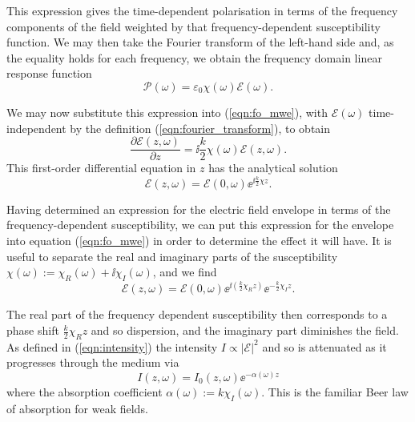     This expression gives the time-dependent polarisation in terms of the
    frequency components of the field weighted by that frequency-dependent
    susceptibility function. We may then take the Fourier transform of the 
    left-hand side and, as the equality holds for each frequency, we obtain the
    frequency domain linear response function
    \begin{equation}\label{eqn:lin_pol_freq} 
      \mathcal{P}(\omega) = \varepsilon_0 \chi(\omega) \mathcal{E}(\omega).
    \end{equation}

    We may now substitute this expression into (\ref{eqn:fo_mwe}), with
    $\mathcal{E}(\omega)$ time-independent by the definition
    (\ref{eqn:fourier_transform}), to obtain
    \begin{equation}\label{eqn:fo_mwe_linear}
      \frac{\partial \mathcal{E}(z, \omega)}{\partial z} = 
      \ii \frac{k}{2} \chi(\omega) \mathcal{E}(z, \omega).
    \end{equation}
    This first-order differential equation in $z$ has the analytical solution 
    \begin{equation}
      \mathcal{E}(z, \omega) = \mathcal{E}(0, \omega) \ee^{\ii \tfrac{k}{2} \chi z}.
    \end{equation}

    Having determined an expression for the electric field envelope in terms of
    the frequency-dependent susceptibility, we can put this expression for the
    envelope into equation (\ref{eqn:fo_mwe}) in order to determine the effect
    it will have. It is useful to separate the real and imaginary parts of the
    susceptibility $\chi(\omega) := \chi_R(\omega) + \ii \chi_I(\omega)$, and we
    find
    \begin{equation}\label{eqn:efield_susc_real_imag}
      \mathcal{E}(z, \omega) = 
      \mathcal{E}(0, \omega)    
      \ee^{\ii(\frac{k}{2} \chi_R z)} 
      \ee^{- \frac{k}{2} \chi_I z}.
    \end{equation}

    The real part of the frequency dependent susceptibility then corresponds to
    a phase shift $\frac{k}{2} \chi_R z$ and so dispersion, and the imaginary
    part diminishes the field. As defined in (\ref{eqn:intensity}) the intensity
    $I \propto |\mathcal{E}|^2$ and so is attenuated as it progresses through
    the medium via
    \begin{equation}\label{eqn:beer_law}
      I(z, \omega) = I_0(z, \omega) \ee^{-\alpha(\omega) z}
    \end{equation}
    where the absorption coefficient $\alpha(\omega) := k \chi_I(\omega)$. This
    is the familiar Beer law of absorption for weak fields.
    
